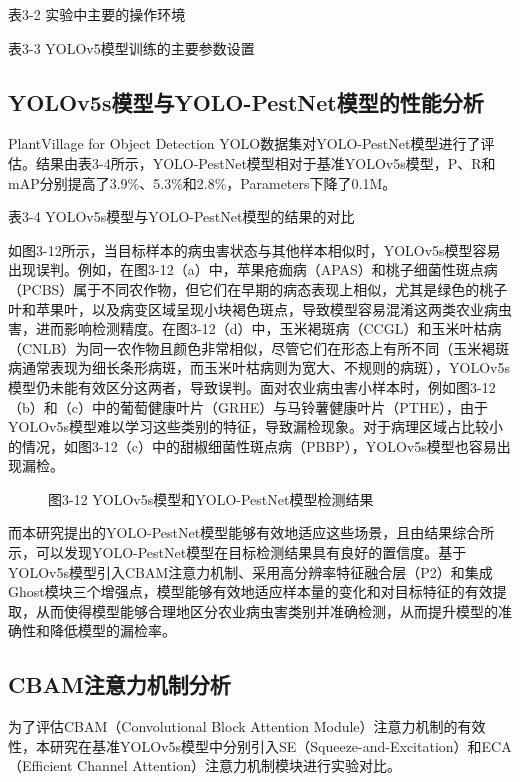 \documentclass[12pt, a4paper, twoside]{ctexart}
\begin{document}
表3-2 实验中主要的操作环境

表3-3 YOLOv5模型训练的主要参数设置


\subsection{YOLOv5s模型与YOLO-PestNet模型的性能分析}

PlantVillage for Object Detection YOLO数据集对YOLO-PestNet模型进行了评估。结果由表3-4所示，YOLO-PestNet模型相对于基准YOLOv5s模型，P、R和mAP分别提高了3.9\%、5.3\%和2.8\%，Parameters下降了0.1M。

表3-4 YOLOv5s模型与YOLO-PestNet模型的结果的对比

如图3-12所示，当目标样本的病虫害状态与其他样本相似时，YOLOv5s模型容易出现误判。例如，在图3-12（a）中，苹果疮痂病（APAS）和桃子细菌性斑点病（PCBS）属于不同农作物，但它们在早期的病态表现上相似，尤其是绿色的桃子叶和苹果叶，以及病变区域呈现小块褐色斑点，导致模型容易混淆这两类农业病虫害，进而影响检测精度。在图3-12（d）中，玉米褐斑病（CCGL）和玉米叶枯病（CNLB）为同一农作物且颜色非常相似，尽管它们在形态上有所不同（玉米褐斑病通常表现为细长条形病斑，而玉米叶枯病则为宽大、不规则的病斑），YOLOv5s模型仍未能有效区分这两者，导致误判。面对农业病虫害小样本时，例如图3-12（b）和（c）中的葡萄健康叶片（GRHE）与马铃薯健康叶片（PTHE），由于YOLOv5s模型难以学习这些类别的特征，导致漏检现象。对于病理区域占比较小的情况，如图3-12（c）中的甜椒细菌性斑点病（PBBP），YOLOv5s模型也容易出现漏检。


\begin{figure}[htbp]
\centering
\caption{图3-12 YOLOv5s模型和YOLO-PestNet模型检测结果}
\end{figure}

而本研究提出的YOLO-PestNet模型能够有效地适应这些场景，且由结果综合所示，可以发现YOLO-PestNet模型在目标检测结果具有良好的置信度。基于YOLOv5s模型引入CBAM注意力机制、采用高分辨率特征融合层（P2）和集成Ghost模块三个增强点，模型能够有效地适应样本量的变化和对目标特征的有效提取，从而使得模型能够合理地区分农业病虫害类别并准确检测，从而提升模型的准确性和降低模型的漏检率。


\subsection{CBAM注意力机制分析}

为了评估CBAM（Convolutional Block Attention Module）注意力机制的有效性，本研究在基准YOLOv5s模型中分别引入SE（Squeeze-and-Excitation）和ECA（Efficient Channel Attention）注意力机制模块进行实验对比。
\end{document}
